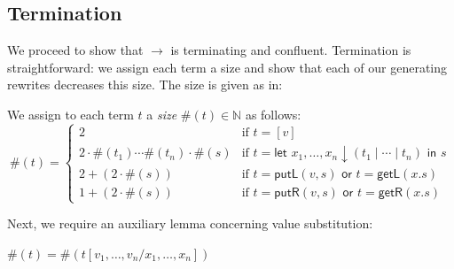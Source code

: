 \documentclass[twoside,11pt,final]{entics}
\newcommand{\getl}{\mathsf{getL}}
\newcommand{\putr}{\mathsf{putR}}
\newcommand{\getr}{\mathsf{getR}}
\newcommand{\putl}{\mathsf{putL}}
\newcommand{\asn}{\downarrow}
\newcommand{\seq}{,\!\ldots\!,}
\begin{document}
\subsection{Termination}
We proceed to show that $\to$ is terminating and confluent. Termination is straightforward: we assign each term a size and show that each of our generating rewrites decreases this size. The size is given as in:
\begin{definition}
  We assign to each term $t$ a \emph{size} $\#(t) \in \mathbb{N}$ as follows:
  \[
    \#(t) = \begin{cases}
            2 & \text{if } t = [v]\\
            2 \cdot \#(t_1) \cdots \#(t_n) \cdot \#(s) & \text{if } t = \textsf{let } x_1,\ldots,x_n \asn (t_1\mid \cdots \mid t_n) \textsf{ in } s\\
              2 + (2 \cdot \#(s)) & \text{if } t = \putl(v,s) \textsf{ or } t = \getl(x.s)\\
              1 + (2 \cdot \#(s)) & \text{if } t = \putr(v,s) \textsf{ or } t = \getr(x.s)
          \end{cases}
  \]
\end{definition}
Next, we require an auxiliary lemma concerning value substitution:
\begin{lemma}\label{lem:subst-size}
  $\#(t) = \#(t[v_1\seq v_n / x_1 \seq x_n])$
\end{lemma}
\end{document}

